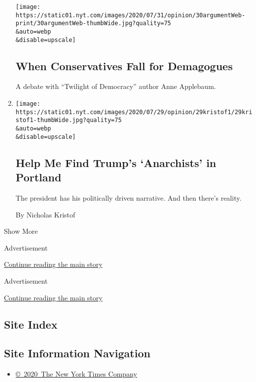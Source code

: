 \begin{enumerate}
  \texttt{[image: https://static01.nyt.com/images/2020/07/31/opinion/30argumentWeb-print/30argumentWeb-thumbWide.jpg?quality=75\\\&auto=webp\\\&disable=upscale]}

  \hypertarget{when-conservatives-fall-for-demagogues}{%
  \subsection{When Conservatives Fall for
  Demagogues}\label{when-conservatives-fall-for-demagogues}}

  A debate with ``Twilight of Democracy'' author Anne Applebaum.
\item
  \href{/2020/07/29/opinion/portland-protests-trump.html}{}

  \texttt{[image: https://static01.nyt.com/images/2020/07/29/opinion/29kristof1/29kristof1-thumbWide.jpg?quality=75\\\&auto=webp\\\&disable=upscale]}

  \hypertarget{help-me-find-trumps-anarchists-in-portland}{%
  \subsection{Help Me Find Trump's `Anarchists' in
  Portland}\label{help-me-find-trumps-anarchists-in-portland}}

  The president has his politically driven narrative. And then there's
  reality.

  By Nicholas Kristof
\end{enumerate}

Show More

Advertisement

\protect\hyperlink{after-mid2}{Continue reading the main story}

Advertisement

\protect\hyperlink{after-mktg}{Continue reading the main story}

\hypertarget{site-index}{%
\subsection{Site Index}\label{site-index}}

\hypertarget{site-information-navigation}{%
\subsection{Site Information
Navigation}\label{site-information-navigation}}

\begin{itemize}
\tightlist
\item
  \href{https://help.nytimes.com/hc/en-us/articles/115014792127-Copyright-notice}{©~2020~The
  New York Times Company}
\end{itemize}

